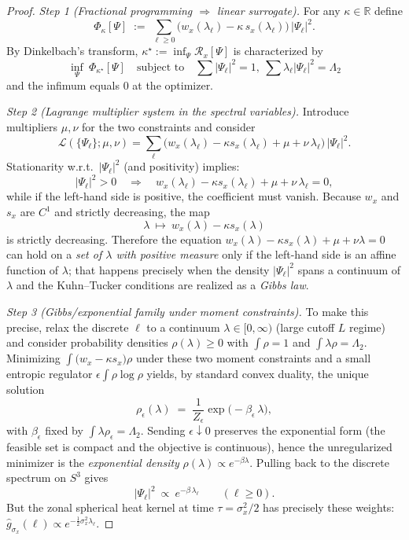 \documentclass[10pt]{article}
\theoremstyle{definition}
\theoremstyle{plain}
\begin{document}
\begin{proof}
\textit{Step 1 (Fractional programming $\Rightarrow$ linear surrogate).}
For any $\kappa\in\mathbb R$ define
\[
\Phi_\kappa[\Psi]\;:=\;\sum_{\ell\ge 0}\bigl(w_x(\lambda_\ell)-\kappa\,s_x(\lambda_\ell)\bigr)\,|\Psi_\ell|^2 .
\]
By Dinkelbach’s transform, $\kappa^\star:=\inf_{\Psi}\mathcal R_x[\Psi]$ is characterized by
\[
\inf_{\Psi}\ \Phi_{\kappa^\star}[\Psi]\quad\text{subject to}\quad \sum |\Psi_\ell|^2=1,\ \sum \lambda_\ell |\Psi_\ell|^2=\Lambda_2
\]
and the infimum equals $0$ at the optimizer.

\medskip
\textit{Step 2 (Lagrange multiplier system in the spectral variables).}
Introduce multipliers $\mu,\nu$ for the two constraints and consider
\[
\mathcal L(\{\Psi_\ell\};\mu,\nu)
=\sum_\ell \Big(w_x(\lambda_\ell)-\kappa s_x(\lambda_\ell)+\mu+\nu\,\lambda_\ell\Big)\,|\Psi_\ell|^2.
\]
Stationarity w.r.t.\ $|\Psi_\ell|^2$ (and positivity) implies:
\[
|\Psi_\ell|^2>0\quad\Rightarrow\quad
w_x(\lambda_\ell)-\kappa s_x(\lambda_\ell)+\mu+\nu\,\lambda_\ell=0,
\]
while if the left-hand side is positive, the coefficient must vanish. Because $w_x$ and $s_x$ are $C^1$ and strictly decreasing, the map
\[
\lambda\ \longmapsto\ w_x(\lambda)-\kappa s_x(\lambda)
\]
is strictly decreasing. Therefore the equation
\(
w_x(\lambda)-\kappa s_x(\lambda)+\mu+\nu\lambda=0
\)
can hold on a \emph{set of $\lambda$ with positive measure} only if the left-hand side is an affine function of $\lambda$; that happens precisely when the density $|\Psi_\ell|^2$ spans a continuum of $\lambda$ and the Kuhn–Tucker conditions are realized as a \emph{Gibbs law}.

\medskip
\textit{Step 3 (Gibbs/exponential family under moment constraints).}
To make this precise, relax the discrete $\ell$ to a continuum $\lambda\in[0,\infty)$ (large cutoff $L$ regime) and consider probability densities $\rho(\lambda)\ge0$ with $\int\rho=1$ and $\int \lambda\rho=\Lambda_2$. Minimizing $\int \big(w_x-\kappa s_x\big)\rho$ under these two moment constraints and a small entropic regulator $\epsilon\int \rho\log\rho$ yields, by standard convex duality, the unique solution
\[
\rho_\epsilon(\lambda)\;=\;\frac{1}{Z_\epsilon}\exp\!\big(-\beta_\epsilon\,\lambda\big),
\]
with $\beta_\epsilon$ fixed by $\int \lambda\rho_\epsilon=\Lambda_2$. Sending $\epsilon\downarrow 0$ preserves the exponential form (the feasible set is compact and the objective is continuous), hence the unregularized minimizer is the \emph{exponential density} $\rho(\lambda)\propto e^{-\beta\lambda}$. Pulling back to the discrete spectrum on $S^3$ gives
\[
|\Psi_\ell|^2\ \propto\ e^{-\beta\,\lambda_\ell}\qquad(\ell\ge 0).
\]
But the zonal spherical heat kernel at time $\tau=\sigma_x^2/2$ has precisely these weights:
\(
\widehat g_{\sigma_x}(\ell)\propto e^{-\frac12\sigma_x^2\lambda_\ell}.
\)


\end{proof}
\end{document}
